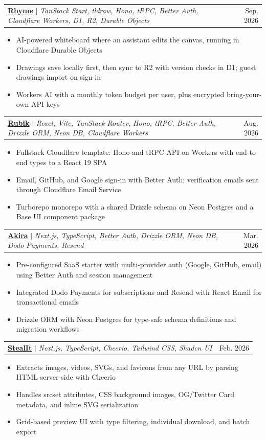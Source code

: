 \documentclass[letterpaper,11pt]{article}
\makeatletter
\newcommand{\resumeItem}[1]{
  \item\small{
    {#1 \vspace{-2pt}}
  }
}
\newcommand{\resumeProjectHeading}[2]{
    \item
    \begin{tabular*}{0.97\textwidth}{l@{\extracolsep{\fill}}r}
      \small#1 & #2 \\
    \end{tabular*}\vspace{-7pt}
}
\newcommand{\resumeItemListStart}{\begin{itemize}}
\newcommand{\resumeItemListEnd}{\end{itemize}\vspace{-5pt}}
\makeatother
\begin{document}
        \resumeProjectHeading
        {\textbf{\href{https://rhyme.sachi.dev}{Rhyme}} $|$ \footnotesize\emph{TanStack Start, tldraw, Hono, tRPC, Better Auth, Cloudflare Workers, D1, R2, Durable Objects}}{Sep. 2026}
        \resumeItemListStart
            \resumeItem{AI-powered whiteboard where an assistant edits the canvas, running in Cloudflare Durable Objects}
            \resumeItem{Drawings save locally first, then sync to R2 with version checks in D1; guest drawings import on sign-in}
            \resumeItem{Workers AI with a monthly token budget per user, plus encrypted bring-your-own API keys}
        \resumeItemListEnd

        \resumeProjectHeading
        {\textbf{\href{https://rubik.sachi.dev}{Rubik}} $|$ \footnotesize\emph{React, Vite, TanStack Router, Hono, tRPC, Better Auth, Drizzle ORM, Neon DB, Cloudflare Workers}}{Aug. 2026}
        \resumeItemListStart
            \resumeItem{Fullstack Cloudflare template: Hono and tRPC API on Workers with end-to-end types to a React 19 SPA}
            \resumeItem{Email, GitHub, and Google sign-in with Better Auth; verification emails sent through Cloudflare Email Service}
            \resumeItem{Turborepo monorepo with a shared Drizzle schema on Neon Postgres and a Base UI component package}
        \resumeItemListEnd

        \resumeProjectHeading
        {\textbf{\href{https://akira.sachi.dev}{Akira}} $|$ \footnotesize\emph{Next.js, TypeScript, Better Auth, Drizzle ORM, Neon DB, Dodo Payments, Resend}}{Mar. 2026}
        \resumeItemListStart
            \resumeItem{Pre-configured SaaS starter with multi-provider auth (Google, GitHub, email) using Better Auth and session management}
            \resumeItem{Integrated Dodo Payments for subscriptions and Resend with React Email for transactional emails}
            \resumeItem{Drizzle ORM with Neon Postgres for type-safe schema definitions and migration workflows}
        \resumeItemListEnd

        \resumeProjectHeading
        {\textbf{\href{https://stealit.sachi.dev}{StealIt}} $|$ \footnotesize\emph{Next.js, TypeScript, Cheerio, Tailwind CSS, Shadcn UI}}{Feb. 2026}
        \resumeItemListStart
            \resumeItem{Extracts images, videos, SVGs, and favicons from any URL by parsing HTML server-side with Cheerio}
            \resumeItem{Handles srcset attributes, CSS background images, OG/Twitter Card metadata, and inline SVG serialization}
            \resumeItem{Grid-based preview UI with type filtering, individual download, and batch export}
        \resumeItemListEnd
\end{document}
